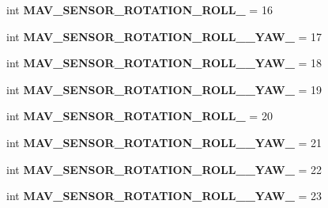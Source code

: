 \begin{DoxyCompactItemize}
int {\bfseries M\+A\+V\+\_\+\+S\+E\+N\+S\+O\+R\+\_\+\+R\+O\+T\+A\+T\+I\+O\+N\+\_\+\+R\+O\+L\+L\+\_} = 16
\item 
\mbox{\label{namespacepymavlink_1_1dialects_1_1v10_a3edf9816ba527ee8f91ebb36d59becee}} 
int {\bfseries M\+A\+V\+\_\+\+S\+E\+N\+S\+O\+R\+\_\+\+R\+O\+T\+A\+T\+I\+O\+N\+\_\+\+R\+O\+L\+L\+\_\+\_\+\+Y\+A\+W\+\_} = 17
\item 
\mbox{\label{namespacepymavlink_1_1dialects_1_1v10_a6a8ea3cd8f9d3452de90e10f90e6b446}} 
int {\bfseries M\+A\+V\+\_\+\+S\+E\+N\+S\+O\+R\+\_\+\+R\+O\+T\+A\+T\+I\+O\+N\+\_\+\+R\+O\+L\+L\+\_\+\_\+\+Y\+A\+W\+\_} = 18
\item 
\mbox{\label{namespacepymavlink_1_1dialects_1_1v10_ad5772d127dd96458b64f84d4a9e64ae0}} 
int {\bfseries M\+A\+V\+\_\+\+S\+E\+N\+S\+O\+R\+\_\+\+R\+O\+T\+A\+T\+I\+O\+N\+\_\+\+R\+O\+L\+L\+\_\+\_\+\+Y\+A\+W\+\_} = 19
\item 
\mbox{\label{namespacepymavlink_1_1dialects_1_1v10_a76dbd316313b36db0e33d3b1a89153e7}} 
int {\bfseries M\+A\+V\+\_\+\+S\+E\+N\+S\+O\+R\+\_\+\+R\+O\+T\+A\+T\+I\+O\+N\+\_\+\+R\+O\+L\+L\+\_} = 20
\item 
\mbox{\label{namespacepymavlink_1_1dialects_1_1v10_afb68278a0afa6e90681fd2d9518f09be}} 
int {\bfseries M\+A\+V\+\_\+\+S\+E\+N\+S\+O\+R\+\_\+\+R\+O\+T\+A\+T\+I\+O\+N\+\_\+\+R\+O\+L\+L\+\_\+\_\+\+Y\+A\+W\+\_} = 21
\item 
\mbox{\label{namespacepymavlink_1_1dialects_1_1v10_a40e9d8d71f208397c50bc8ebfd08b598}} 
int {\bfseries M\+A\+V\+\_\+\+S\+E\+N\+S\+O\+R\+\_\+\+R\+O\+T\+A\+T\+I\+O\+N\+\_\+\+R\+O\+L\+L\+\_\+\_\+\+Y\+A\+W\+\_} = 22
\item 
\mbox{\label{namespacepymavlink_1_1dialects_1_1v10_ab9fd5504458f32ea363bf4792edee6fd}} 
int {\bfseries M\+A\+V\+\_\+\+S\+E\+N\+S\+O\+R\+\_\+\+R\+O\+T\+A\+T\+I\+O\+N\+\_\+\+R\+O\+L\+L\+\_\+\_\+\+Y\+A\+W\+\_} = 23
\item 

\end{DoxyCompactItemize}
